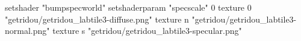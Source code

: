 setshader "bumpspecworld"
setshaderparam "specscale" 0
texture 0 "getridou/getridou_labtile3-diffuse.png"
texture n "getridou/getridou_labtile3-normal.png"
texture s "getridou/getridou_labtile3-specular.png"